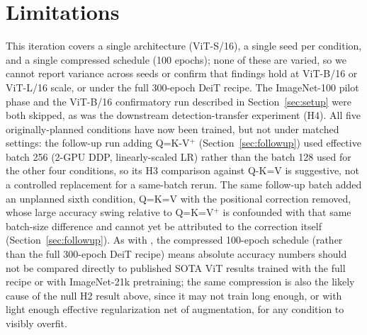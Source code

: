 \documentclass[11pt]{article}
\begin{document}
\section{Limitations}
\label{sec:limitations}
This iteration covers a single architecture (ViT-S/16), a single seed per
condition, and a single compressed schedule (100 epochs); none of these are
varied, so we cannot report variance across seeds or confirm that findings
hold at ViT-B/16 or ViT-L/16 scale, or under the full 300-epoch DeiT recipe.
The ImageNet-100 pilot phase and the ViT-B/16 confirmatory run described in
Section~\ref{sec:setup} were both skipped, as was the downstream
detection-transfer experiment (H4). All five originally-planned conditions
have now been trained, but not under matched settings: the follow-up run
adding Q=K-V\(^+\) (Section~\ref{sec:followup}) used effective batch 256 (2-GPU
DDP, linearly-scaled LR) rather than the batch 128 used for the other four
conditions, so its H3 comparison against Q-K=V is suggestive, not a
controlled replacement for a same-batch rerun. The same follow-up batch
added an unplanned sixth condition, Q=K=V with the positional correction
removed, whose large accuracy swing relative to Q=K=V\(^+\) is confounded
with that same batch-size difference and cannot yet be attributed to the
correction itself (Section~\ref{sec:followup}). As with \citet{kayyam2026three},
the compressed 100-epoch schedule (rather than the full 300-epoch DeiT
recipe) means absolute accuracy numbers should not be compared directly to
published SOTA ViT results trained with the full recipe or with
ImageNet-21k pretraining; the same compression is also the likely cause of
the null H2 result above, since it may not train long enough, or with light
enough effective regularization net of augmentation, for any condition to
visibly overfit.
\end{document}
